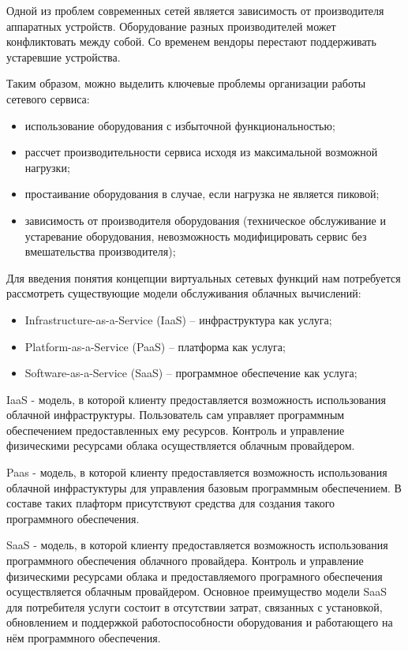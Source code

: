 \documentclass[oneside,final,14pt,a4paper]{extreport}
\begin{document}
Одной из проблем современных сетей является зависимость от производителя аппаратных устройств. Оборудование разных производителей может конфликтовать между собой. Со временем вендоры перестают поддерживать устаревшие устройства.

Таким образом, можно выделить ключевые проблемы организации работы сетевого сервиса:
\begin{itemize}
	\item использование оборудования с избыточной функциональностью;
	\item рассчет производительности сервиса исходя из максимальной возможной нагрузки;
	\item простаивание оборудования в случае, если нагрузка не является пиковой;
	\item зависимость от производителя оборудования (техническое обслуживание и устаревание оборудования, невозможность модифицировать сервис без вмешательства производителя);
\end{itemize}

Для введения понятия концепции виртуальных сетевых функций нам потребуется рассмотреть существующие модели обслуживания облачных вычислений: 
\begin{itemize}
	\item Infrastructure-as-a-Service (IaaS) -- инфраструктура как услуга;
	\item Platform-as-a-Service (PaaS) --  платформа как услуга;
	\item Software-as-a-Service (SaaS) -- программное обеспечение как услуга;
\end{itemize}

IaaS - модель, в которой клиенту предоставляется возможность использования облачной инфраструктуры. Пользователь сам управляет программным обеспечением предоставленных ему ресурсов. Контроль и управление физическими ресурсами облака осуществляется облачным провайдером.

Paas - модель, в которой клиенту предоставляется возможность использования облачной инфрастуктуры для управления базовым программным обеспечением. В составе таких плафторм присутствуют средства для создания такого программного обеспечения.

SaaS - модель, в которой клиенту предоставляется возможность использования программного обеспечения облачного провайдера. Контроль и управление физическими ресурсами облака и предоставляемого програмного обеспечения осуществляется облачным провайдером. Основное преимущество модели SaaS для потребителя услуги состоит в отсутствии затрат, связанных с установкой, обновлением и поддержкой работоспособности оборудования и работающего на нём программного обеспечения.~\cite{bib:saas}
\end{document}
